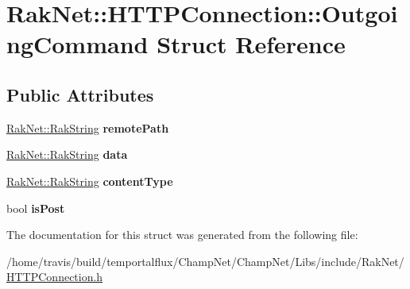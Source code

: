 \hypertarget{struct_rak_net_1_1_h_t_t_p_connection_1_1_outgoing_command}{\section{Rak\-Net\-:\-:H\-T\-T\-P\-Connection\-:\-:Outgoing\-Command Struct Reference}
\label{struct_rak_net_1_1_h_t_t_p_connection_1_1_outgoing_command}
}
\subsection*{Public Attributes}
\begin{DoxyCompactItemize}
\item 
\hypertarget{struct_rak_net_1_1_h_t_t_p_connection_1_1_outgoing_command_a0799274c558eb4a7558942019f253ddd}{\hyperlink{class_rak_net_1_1_rak_string}{Rak\-Net\-::\-Rak\-String} {\bfseries remote\-Path}}\label{struct_rak_net_1_1_h_t_t_p_connection_1_1_outgoing_command_a0799274c558eb4a7558942019f253ddd}

\item 
\hypertarget{struct_rak_net_1_1_h_t_t_p_connection_1_1_outgoing_command_a1fafad9bfeaf8832a12edb3150bfdb5a}{\hyperlink{class_rak_net_1_1_rak_string}{Rak\-Net\-::\-Rak\-String} {\bfseries data}}\label{struct_rak_net_1_1_h_t_t_p_connection_1_1_outgoing_command_a1fafad9bfeaf8832a12edb3150bfdb5a}

\item 
\hypertarget{struct_rak_net_1_1_h_t_t_p_connection_1_1_outgoing_command_a4b82abcd567aab6e85530d03bf0c720f}{\hyperlink{class_rak_net_1_1_rak_string}{Rak\-Net\-::\-Rak\-String} {\bfseries content\-Type}}\label{struct_rak_net_1_1_h_t_t_p_connection_1_1_outgoing_command_a4b82abcd567aab6e85530d03bf0c720f}

\item 
\hypertarget{struct_rak_net_1_1_h_t_t_p_connection_1_1_outgoing_command_a131a530db548a685d5d919ef4bc73556}{bool {\bfseries is\-Post}}\label{struct_rak_net_1_1_h_t_t_p_connection_1_1_outgoing_command_a131a530db548a685d5d919ef4bc73556}

\end{DoxyCompactItemize}


The documentation for this struct was generated from the following file\-:\begin{DoxyCompactItemize}
\item 
/home/travis/build/temportalflux/\-Champ\-Net/\-Champ\-Net/\-Libs/include/\-Rak\-Net/\hyperlink{_h_t_t_p_connection_8h}{H\-T\-T\-P\-Connection.\-h}\end{DoxyCompactItemize}
